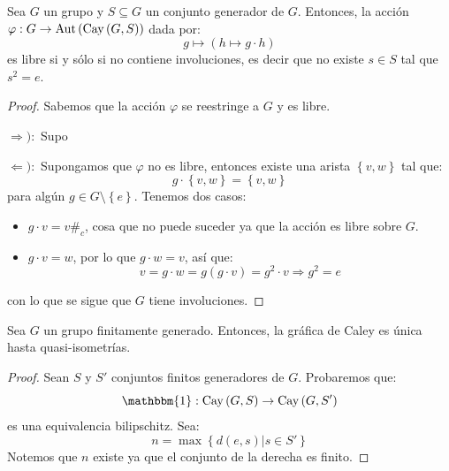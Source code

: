 \documentclass[12pt]{report}
\newcounter{it}
\theoremstyle{largebreak}
\newcommand\cf[3]{\ensuremath{#1:#2\rightarrow#3}}
\newcommand\contradiction{\ensuremath{\#_c}}
\newcommand{\bbm}[1]{\ensuremath{\mathbbm{#1}}}
\newcommand\Aut[1]{\ensuremath{\textup{Aut}\left(#1\right)}}
\newcommand{\Cay}[1]{\ensuremath{\textup{Cay}\left(#1\right)}}
\begin{document}
    \begin{propo}
        Sea $G$ un grupo y $S\subseteq G$ un conjunto generador de $G$. Entonces, la acción $\cf{\varphi}{G}{\Aut{\Cay{G,S}}}$ dada por:
        \begin{equation*}
            g\mapsto(h\mapsto g\cdot h)
        \end{equation*}
        es libre si y sólo si no contiene involuciones, es decir que no existe $s\in S$ tal que $s^2=e$.
    \end{propo}

    \begin{proof}
        Sabemos que la acción $\varphi$ se reestringe a $G$ y es libre.

        $\Rightarrow):$ Supo

        $\Leftarrow):$ Supongamos que $\varphi$ no es libre, entonces existe una arista $\left\{v,w \right\}$ tal que:
        \begin{equation*}
            g\cdot\left\{v,w \right\}=\left\{v,w \right\}
        \end{equation*}
        para algún $g\in G\setminus\left\{e \right\}$. Tenemos dos casos:
        \begin{itemize}
            \item $g\cdot v=v$\contradiction, cosa que no puede suceder ya que la acción es libre sobre $G$.
            \item $g\cdot v=w$, por lo que $g\cdot w=v$, así que:
            \begin{equation*}
                v=g\cdot w=g(g\cdot v)=g^2\cdot v\Rightarrow g^2=e
            \end{equation*}
        \end{itemize}
        con lo que se sigue que $G$ tiene involuciones.
    \end{proof}

    \begin{propo}
        Sea $G$ un grupo finitamente generado. Entonces, la gráfica de Caley es única hasta quasi-isometrías.
    \end{propo}

    \begin{proof}
        Sean $S$ y $S'$ conjuntos finitos generadores de $G$. Probaremos que:
        \begin{equation*}
            \cf{\bbm{1}}{\Cay{G,S}}{\Cay{G,S'}}
        \end{equation*}
        es una equivalencia bilipschitz. Sea:
        \begin{equation*}
            n=\max\left\{d(e,s)\Big|s\in S' \right\}
        \end{equation*}
        Notemos que $n$ existe ya que el conjunto de la derecha es finito.
    \end{proof}
\end{document}
